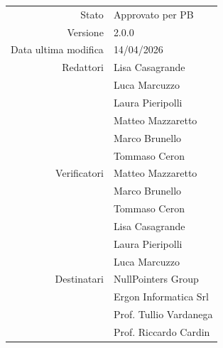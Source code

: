 \begin{center}
\begin{tabular}{r|l}
    Stato & Approvato per PB \\[0.5em]
    Versione & 2.0.0 \\[0.5em]
    Data ultima modifica & 14/04/2026 \\[0.5em]
    Redattori & Lisa Casagrande \\
              & Luca Marcuzzo \\
              & Laura Pieripolli\\
              & Matteo Mazzaretto \\
              & Marco Brunello \\ 
              & Tommaso Ceron \\ [0.5em]
    Verificatori & Matteo Mazzaretto \\
                 & Marco Brunello \\
                 & Tommaso Ceron \\
                 & Lisa Casagrande \\
                 & Laura Pieripolli \\
                 & Luca Marcuzzo \\ [0.5em]
    Destinatari & NullPointers Group \\
                & Ergon Informatica Srl \\
                & Prof. Tullio Vardanega \\
                & Prof. Riccardo Cardin \\
\end{tabular}
\end{center}
